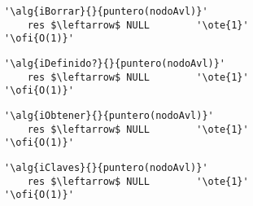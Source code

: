 \begin{lstlisting}[mathescape]
'\alg{iBorrar}{}{puntero(nodoAvl)}'
	res $\leftarrow$ NULL		 '\ote{1}'
'\ofi{O(1)}'
\end{lstlisting}

\begin{lstlisting}[mathescape]
'\alg{iDefinido?}{}{puntero(nodoAvl)}'
	res $\leftarrow$ NULL		 '\ote{1}'
'\ofi{O(1)}'
\end{lstlisting}

\begin{lstlisting}[mathescape]
'\alg{iObtener}{}{puntero(nodoAvl)}'
	res $\leftarrow$ NULL		 '\ote{1}'
'\ofi{O(1)}'
\end{lstlisting}

\begin{lstlisting}[mathescape]
'\alg{iClaves}{}{puntero(nodoAvl)}'
	res $\leftarrow$ NULL		 '\ote{1}'
'\ofi{O(1)}'
\end{lstlisting}
